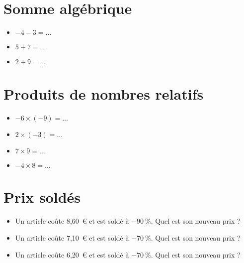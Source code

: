 \documentclass[a4paper,11pt,fleqn]{article}
\begin{document}
\section{Somme algébrique}
\begin{itemize}

  \item $-4 -3=\ldots$
  \item $5 +7=\ldots$
  \item $2 +9=\ldots$
\end{itemize}


\section{Produits de nombres relatifs}
\begin{itemize}

  \item $-6\times(-9)=\ldots$
  \item $2\times(-3)=\ldots$
  \item $7\times9=\ldots$
  \item $-4\times8=\ldots$
\end{itemize}


\section{Prix soldés}
\begin{itemize}

  \item Un article coûte 8,60~€ et est soldé à $-90~\%$. Quel est son nouveau prix ?
  \item Un article coûte 7,10~€ et est soldé à $-70~\%$. Quel est son nouveau prix ?
  \item Un article coûte 6,20~€ et est soldé à $-70~\%$. Quel est son nouveau prix ?
\end{itemize}
\end{document}
